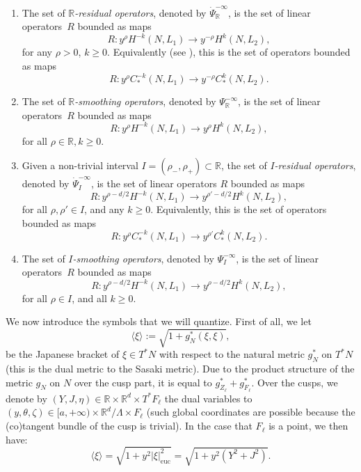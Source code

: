 \documentclass[10pt]{amsart}
\newcommand{\R}{\mathbb{R}}
\theoremstyle{plain}
\theoremstyle{definition}
\begin{document}
\begin{enumerate}
\item The set of \emph{$\R$-residual operators}, denoted by $\dot{\Psi}^{-\infty}_\R$, is the set of linear operators~$R$ bounded as maps
\[
R : y^{\rho} H^{-k}(N,L_1) \to y^{-\rho} H^k(N,L_2),
\]
for any $\rho > 0$, $k \geq 0$. Equivalently (see \cite[Prop.\,3.3]{Bonthonneau-Lefeuvre-19-1}), this is the set of operators bounded as maps
\[
R : y^{\rho} C^{-k}_*(N,L_1) \to y^{-\rho} C^k_*(N,L_2).
\]

\item The set of \emph{$\R$-smoothing operators}, denoted by $\Psi^{-\infty}_\R$, is the set of linear operators~$R$ bounded as maps
\[
R : y^{\rho} H^{-k}(N,L_1) \to y^{\rho} H^k(N,L_2),
\]
for all $\rho \in \R, k \geq 0$.

\item Given a non-trivial interval $I= (\rho_-, \rho_+)\subset \R$, the set of \emph{$I$-residual operators}, denoted by $\dot{\Psi}^{-\infty}_I$, is the set of linear operators $R$ bounded as maps
\[
R : y^{\rho - d/2}H^{-k}(N,L_1) \to y^{\rho' -d/2} H^k(N,L_2),
\]
for all $\rho, \rho'\in I$, and any $k \geq 0$. Equivalently, this is the set of operators bounded as maps
\[
R : y^{\rho}C^{-k}_\ast(N,L_1) \to y^{\rho'}C^k_\ast(N,L_2).
\]

\item The set of \emph{$I$-smoothing operators}, denoted by $\Psi^{-\infty}_I$, is the set of linear operators~$R$ bounded as maps
\[
R : y^{\rho - d/2}H^{-k}(N,L_1) \to y^{\rho -d/2} H^k(N,L_2),
\]
for all $\rho\in I$, and all $k\geq 0$.

\end{enumerate}

We now introduce the symbols that we will quantize. First of all, we let
\[
\langle \xi \rangle := \sqrt{1+g^*_N(\xi,\xi)},
\]
be the Japanese bracket of $\xi \in T^*N$ with respect to the natural metric $g_N^\ast$ on $T^\ast N$ (this is the dual metric to the Sasaki metric). Due to the product structure of the metric $g_N$ on $N$ over the cusp part, it is equal to $g_{Z_\ell}^\ast + g_{F_\ell}^\ast$. Over the cusps, we denote by $(Y,J,\eta) \in \R \times \R^d \times T^*F_{\ell}$ the dual variables to $(y,\theta,\zeta) \in [a,+\infty) \times \R^d/\Lambda \times F_{\ell}$ (such global coordinates are possible because the (co)tangent bundle of the cusp is trivial). In the case that $F_\ell$ is a point, we then have:
\[
\langle \xi \rangle = \sqrt{1+y^2|\xi|_{\mathrm{euc}}^2} = \sqrt{1+y^2(Y^2+J^2)}.
\]
\end{document}
